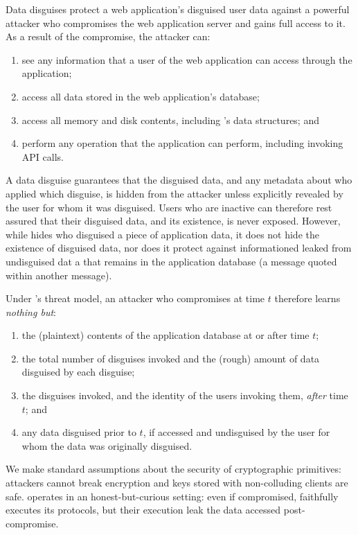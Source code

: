 %
Data disguises protect a web application's disguised user data against a
powerful attacker who compromises the web application server and gains full
access to it.
%
As a result of the compromise, the attacker can:
\begin{enumerate}[nosep]
 \item see any information that a user of the web application can access through
   the application;
  \item access all data stored in the web application's database;
  \item access all memory and disk contents, including \sys's data structures; and
  \item perform any operation that the application can perform, including invoking
    \sys API calls.
\end{enumerate}
%
A data disguise guarantees that the disguised data, and any metadata about who applied
which disguise, is hidden from the attacker unless explicitly revealed by the user
for whom it was disguised.
%
Users who are inactive can therefore rest assured that their disguised data, and
its existence, is never exposed.
%
However, while \sys hides who disguised a piece of application data, it does not hide
the existence of disguised data, nor does it protect against informationed leaked from
undisguised dat a that remains in the application database (\eg a message quoted
within another message).
%

%
Under \sys's threat model, an attacker who compromises \sys at time $t$ therefore
learns \emph{nothing but}:
%
\begin{enumerate}[nosep]
  \item the (plaintext) contents of the application database at or after time $t$;
  \item the total number of disguises invoked and the (rough) amount of data
    disguised by each disguise;
  \item the disguises invoked, and the identity of the users invoking them,
    \emph{after} time $t$; and
  \item any data disguised prior to $t$, if accessed and undisguised by the user
    for whom the data was originally disguised.
\end{enumerate}
%
We make standard assumptions about the security of cryptographic primitives: attackers
cannot break encryption and keys stored with non-colluding clients are safe.
%
\sys operates in an honest-but-curious setting: even if compromised, \sys faithfully
executes its protocols, but their execution leak the data accessed post-compromise.
%


